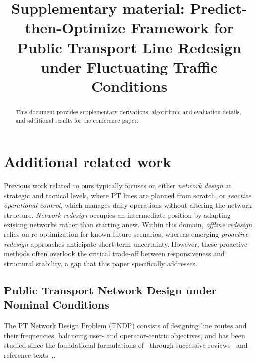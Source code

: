 \documentclass[a4paper,fleqn]{cas-sc}
\begin{document}
\title [mode = title]{Supplementary material: Predict-then-Optimize Framework for Public Transport Line Redesign under Fluctuating Traffic Conditions}
\begin{abstract}
This document provides supplementary derivations, algorithmic and evaluation details, and additional results for the conference paper.
\end{abstract}
\maketitle
\appendix

\section{Additional related work}\label{sec:relatedWork}

Previous work related to ours typically focuses on either \textit{network design} at strategic and tactical levels, where PT lines are planned from scratch, or \textit{reactive operational control}, which manages daily operations without altering the network structure.
\textit{Network redesign} occupies an intermediate position by adapting existing networks rather than starting anew.
Within this domain, \textit{offline redesign} relies on re-optimization for known future scenarios, whereas emerging \textit{proactive redesign} approaches anticipate short-term uncertainty.
However, these proactive methods often overlook the critical trade-off between responsiveness and structural stability, a gap that this paper specifically addresses.

\subsection{Public Transport Network Design under Nominal Conditions}
\label{sec:preventive}

The PT Network Design Problem (TNDP) consists of designing line routes and their frequencies, balancing user- and operator-centric objectives, and has been studied since the foundational formulations of~\cite{ceder1986bus} through successive reviews~\citep{guihaire2008transit, kepaptsoglou2009transit, duran2022survey} and reference texts~\citep{desaulniers2007public, ceder2016public},\cite{gkiotsalitis2020public}.
\end{document}
